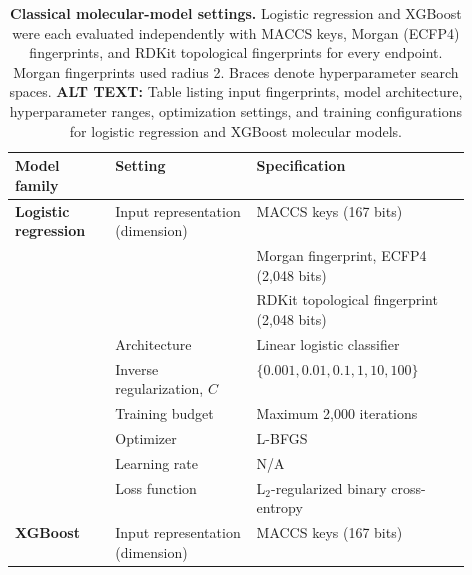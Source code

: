 \documentclass[11pt,a4paper]{article}
\begin{document}
\begin{table}[p]
\centering
\captionsetup{width=\linewidth}
\caption{\textbf{Classical molecular-model settings.}
Logistic regression and XGBoost were each evaluated independently with
MACCS keys, Morgan (ECFP4) fingerprints, and RDKit topological
fingerprints for every endpoint. Morgan fingerprints used radius 2.
Braces denote hyperparameter search spaces. \textbf{ALT TEXT:}
Table listing input fingerprints, model architecture, hyperparameter
ranges, optimization settings, and training configurations for logistic
regression and XGBoost molecular models.}
\label{tab:stage1-classical-settings}

\footnotesize
\setlength{\tabcolsep}{4pt}
\renewcommand{\arraystretch}{1.05}
\setlength{\arrayrulewidth}{0.6pt}

\begin{tabularx}{\linewidth}{
@{}
>{\raggedright\arraybackslash}p{0.22\linewidth}|
>{\raggedright\arraybackslash}p{0.31\linewidth}
>{\raggedright\arraybackslash}X
@{}
}
\toprule
\textbf{Model family}
& \textbf{Setting}
& \textbf{Specification} \\
\midrule

\textbf{Logistic regression}
& Input representation (dimension)
& MACCS keys (167 bits) \\

&
& Morgan fingerprint, ECFP4 (2,048 bits) \\

&
& RDKit topological fingerprint (2,048 bits) \\

& Architecture
& Linear logistic classifier \\

& Inverse regularization, \(C\)
& \(\{0.001, 0.01, 0.1, 1, 10, 100\}\) \\

& Training budget
& Maximum 2,000 iterations \\

& Optimizer
& L-BFGS \\

& Learning rate
& N/A \\

& Loss function
& L$_2$-regularized binary cross-entropy \\

\midrule

\textbf{XGBoost}
& Input representation (dimension)
& MACCS keys (167 bits) \\


\end{tabularx}
\end{table}
\end{document}
